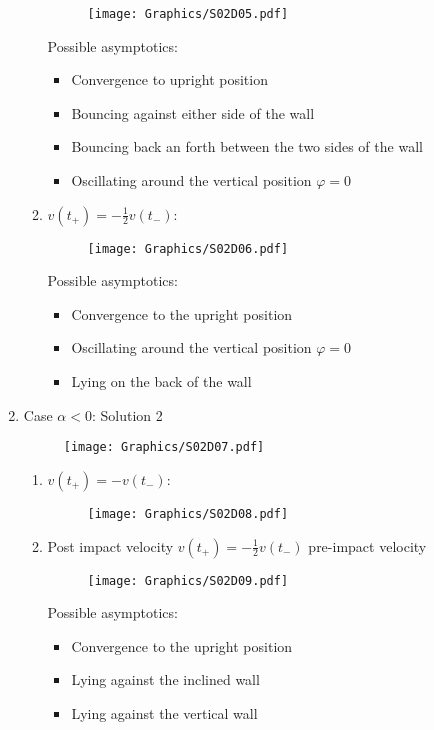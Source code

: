 \documentclass[twoside,10pt,a4paper]{article}
\begin{document}
\begin{enumerate}[label=(\arabic*)]
\begin{enumerate}[label=(\roman*)]
\begin{figure}[H]
	\centering
	\texttt{[image: Graphics/S02D05.pdf]}
\end{figure}
Possible asymptotics:
\begin{itemize}
	\item Convergence to upright position
	\item Bouncing against either side of the wall
	\item Bouncing back an forth between the two sides of the wall
	\item Oscillating around the vertical position $\varphi = 0$
\end{itemize}


\item $ v(t_+) = -\frac{1}{2}v(t_-) $:
\begin{figure}[H]
	\centering
	\texttt{[image: Graphics/S02D06.pdf]}
\end{figure}
Possible asymptotics:
\begin{itemize}
	\item Convergence to the upright position
	\item Oscillating around the vertical position $\varphi = 0$
	\item Lying on the back of the wall
\end{itemize}
\end{enumerate}
\newpage
\item Case $\alpha < 0$: Solution 2
\begin{figure}[H]
	\centering
	\texttt{[image: Graphics/S02D07.pdf]}
\end{figure}

\begin{enumerate}[label=(\roman*)]
\item $ v(t_+) = -v(t_-) $:

\begin{figure}[H]
	\centering
	\texttt{[image: Graphics/S02D08.pdf]}
\end{figure}

\item Post impact velocity $ v(t_+) = -\frac{1}{2}v(t_-) $ pre-impact velocity
\begin{figure}[H]
	\centering
	\texttt{[image: Graphics/S02D09.pdf]}
\end{figure}
Possible asymptotics:
\begin{itemize}
	\item Convergence to the upright position
	\item Lying against the inclined wall
	\item Lying against the vertical wall
\end{itemize}
\end{enumerate}

\end{enumerate}
\end{document}
